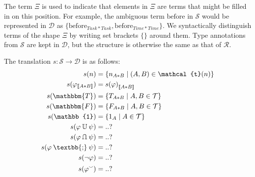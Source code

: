 \documentclass[12pt]{article}
\newcommand{\typesemi}{\mathbin{\text{\textbb{;}}}}
\newcommand{\typeunion}{\mathbin{\mathbb{U}}}
\newcommand{\typeinter}{\mathbin{\text{\rotatebox[origin=c]{180}{$\typeunion$}}}}
\newcommand{\typevee}{\mathbbm{T}}
\newcommand{\typenil}{\mathbbm{F}}
\newcommand{\typecomp}[1]{\neg{#1}}
\newcommand{\typeconv}[1]{{#1}^\smallsmile}
\newcommand{\typeident}{\mathbb{1}}
\newcommand{\typetyped}[2]{{#1}_{\llbracket #2 \rrbracket}}
\begin{document}
The term $\Xi$ is used to indicate that elements in $\Xi$ are terms that might be filled in on this position.
For example, the ambiguous term $\mathrm{before}$ in $\mathcal{S}$ would be represented in $\mathcal{D}$ as $\{\mathrm{before}_{Task*Task},\mathrm{before}_{Time*Time}\}$.
We syntactically distinguish terms of the shape $\Xi$ by writing set brackets $\{\}$ around them.
Type annotations from $\mathcal{S}$ are kept in $\mathcal{D}$, but the structure is otherwise the same as that of $\mathcal{R}$.

The translation $s : \mathcal{S} \to \mathcal{D}$ is as follows:
\begin{align*}
s(n) &= \{n_{A*B} \mid (A,B)\in\mathcal{t}(n)\}\\
s(\typetyped{\varphi}{A*B}) &= \typetyped{s(\varphi)}{A*B}\\
s(\typevee) &= \{T_{A*B} \mid A,B\in\mathcal{T}\}\\
s(\typenil) &= \{F_{A*B} \mid A,B\in\mathcal{T}\}\\
s(\typeident) &= \{1_{A} \mid A\in\mathcal{T}\}\\
s(\varphi \typeunion \psi) &= ..?\\
s(\varphi \typeinter \psi) &= ..?\\
s(\varphi \typesemi \psi) &= ..?\\
s(\typecomp{\varphi}) &= ..?\\
s(\typeconv{\varphi}) &= ..?
\end{align*}

\end{document}
